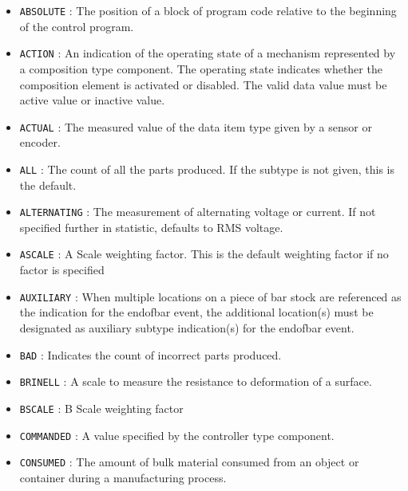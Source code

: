 \begin{itemize}

\item \texttt{ABSOLUTE} : The position of a block of program code relative to the beginning of the control program. 

\item \texttt{ACTION} : An indication of the operating state of a mechanism represented by a composition type component.
 The operating state indicates whether the composition element is activated or disabled. 
 The valid data value must be active value or inactive value. 

\item \texttt{ACTUAL} : The measured value of the data item type given by a sensor or encoder. 

\item \texttt{ALL} : The count of all the parts produced.  If the subtype is not given, this is the default. 

\item \texttt{ALTERNATING} : The measurement of alternating voltage or current.   If not specified further in statistic, defaults to RMS voltage.  

\item \texttt{A\textunderscore SCALE} : A Scale weighting factor.   This is the default weighting factor if no factor is specified 

\item \texttt{AUXILIARY} : When multiple locations on a piece of bar stock are referenced as the indication for the endofbar event, the additional location(s) must be designated as auxiliary subtype indication(s) for the endofbar event.   

\item \texttt{BAD} : Indicates the count of incorrect parts produced. 

\item \texttt{BRINELL} : A scale to measure the resistance to deformation of a surface. 

\item \texttt{B\textunderscore SCALE} : B Scale weighting factor 

\item \texttt{COMMANDED} : A value specified by the controller type component. 

\item \texttt{CONSUMED} : The amount of bulk material consumed from an object or container during a manufacturing process. 


\end{itemize}

